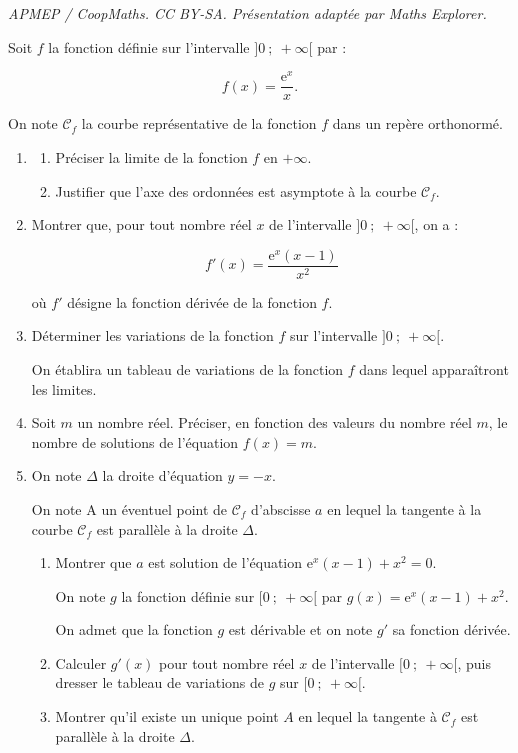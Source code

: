 \documentclass[10pt]{article}
\begin{document}
\noindent\textit{APMEP / CoopMaths. CC BY-SA. Présentation adaptée par Maths Explorer.}\par\medskip
\medskip

Soit $f$ la fonction définie sur l'intervalle $]0~;~ +\infty[$ par :

\[f(x) = \dfrac{\text{e}^x}{x}.\]

On note $\mathcal{C}_f$ la courbe représentative de la fonction $f$ dans un repère orthonormé. 

\medskip

\begin{enumerate}
\item 
	\begin{enumerate}
		\item Préciser la limite de la fonction $f$ en $+ \infty$.
		\item Justifier que l'axe des ordonnées est asymptote à la courbe $\mathcal{C}_f$.
	\end{enumerate}
\item  Montrer que, pour tout nombre réel $x$ de l'intervalle $]0~;~ +\infty[$, on a :

\[f'(x) = \dfrac{\text{e}^x(x - 1)}{x^2}\]

où $f'$ désigne la fonction dérivée de la fonction $f$.
\item Déterminer les variations de la fonction $f$ sur l'intervalle $]0~;~ +\infty[$. 

On établira un tableau de variations de la fonction $f$ dans lequel apparaîtront les limites. 
\item Soit $m$ un nombre réel. Préciser, en fonction des valeurs du nombre réel $m$, le nombre de solutions de l'équation $f(x) = m$.
\item  On note $\Delta$ la droite d'équation $y = -x$.

On note A un éventuel point de $\mathcal{C}_f$ d'abscisse $a$ en lequel la tangente à la courbe $\mathcal{C}_f$ est parallèle à la droite $\Delta$.
	\begin{enumerate}
		\item Montrer que $a$ est solution de l'équation $\text{e}^x(x - 1) + x^2  = 0$.
	
On note $g$ la fonction définie sur $[0~;~ +\infty[$ par $g(x) = \text{e}^x(x - 1) + x^2 $.

On admet que la fonction $g$ est dérivable et on note $g'$ sa fonction dérivée.
		\item Calculer $g'(x)$ pour tout nombre réel $x$ de l'intervalle $[0~;~ +\infty[$, puis dresser le tableau de variations de $g$ sur $[0~;~+\infty[$.
		\item Montrer qu'il existe un unique point $A$ en lequel la tangente à $\mathcal{C}_f$ est parallèle à la droite $\Delta$.
	\end{enumerate}
\end{enumerate}

\bigskip
\end{document}
